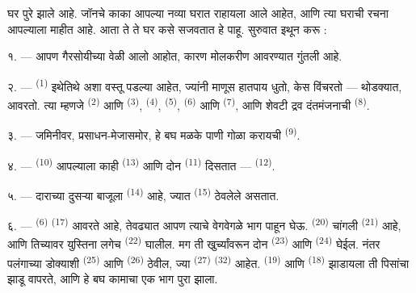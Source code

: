 \VUsaut{6.0mm}
\VUsaut{1.4mm}
\VUsaut{0.4mm}
\VUsaut{2.2mm}

घर पुरे झाले आहे. जॉनचे काका आपल्या नव्या घरात राहायला आले आहेत, आणि त्या घराची रचना आपल्याला
माहीत आहे. आता ते ते घर कसे सजवतात हे पाहू. सुरुवात इथून करू :

\VUsaut{3.0mm}

१. --- आपण गैरसोयीच्या वेळी आलो आहोत, कारण मोलकरीण  आवरण्यात गुंतली आहे.

२. ---  \textsuperscript{(1)} इथेतिथे अशा वस्तू पडल्या आहेत, ज्यांनी
माणूस हातपाय धुतो, केस विंचरतो — थोडक्यात, आवरतो. त्या म्हणजे 
\textsuperscript{(2)} आणि  \textsuperscript{(3)},
 \textsuperscript{(4)},  \textsuperscript{(5)}, 
\textsuperscript{(6)} आणि  \textsuperscript{(7)}, आणि शेवटी द्रव दंतमंजनाची
 \textsuperscript{(8)}.

३. --- जमिनीवर, प्रसाधन-मेजासमोर, हे बघ मळके पाणी गोळा करायची 
\textsuperscript{(9)}.

४. ---  \textsuperscript{(10)} आपल्याला काही 
\textsuperscript{(13)} आणि दोन  \textsuperscript{(11)} दिसतात —
 \textsuperscript{(12)}.

५. --- दाराच्या दुसऱ्या बाजूला  \textsuperscript{(14)} आहे, ज्यात
 \textsuperscript{(15)} ठेवलेले असतात.

६. ---  \textsuperscript{(6)}  \textsuperscript{(17)} आवरते आहे,
तेवढ्यात आपण त्याचे वेगवेगळे भाग पाहून घेऊ.  \textsuperscript{(20)}
चांगली  \textsuperscript{(21)} आहे, आणि तिच्यावर युस्तिना लगेच
 \textsuperscript{(22)} घालील. मग ती खुर्च्यांवरून दोन 
\textsuperscript{(23)} आणि  \textsuperscript{(24)} घेईल. नंतर पलंगाच्या
डोक्याशी  \textsuperscript{(25)} आणि  \textsuperscript{(26)} ठेवील,
ज्या  \textsuperscript{(27)}  \textsuperscript{(32)} आहेत.
 \textsuperscript{(19)} आणि  \textsuperscript{(18)} झाडायला ती
पिसांचा झाडू वापरते, आणि हे बघ कामाचा एक भाग पुरा झाला.

